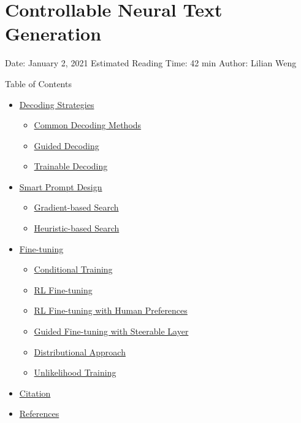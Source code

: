 \section{Controllable Neural Text Generation}\label{controllable-neural-text-generation}

Date: January 2, 2021 \textbar{} Estimated Reading Time: 42 min \textbar{} Author: Lilian Weng

{Table of Contents}

\begin{itemize}
\tightlist
\item
  \hyperref[decoding-strategies]{Decoding Strategies}

  \begin{itemize}
  \tightlist
  \item
    \hyperref[common-decoding-methods]{Common Decoding Methods}
  \item
    \hyperref[guided-decoding]{Guided Decoding}
  \item
    \hyperref[trainable-decoding]{Trainable Decoding}
  \end{itemize}
\item
  \hyperref[smart-prompt-design]{Smart Prompt Design}

  \begin{itemize}
  \tightlist
  \item
    \hyperref[gradient-based-search]{Gradient-based Search}
  \item
    \hyperref[heuristic-based-search]{Heuristic-based Search}
  \end{itemize}
\item
  \hyperref[fine-tuning]{Fine-tuning}

  \begin{itemize}
  \tightlist
  \item
    \hyperref[conditional-training]{Conditional Training}
  \item
    \hyperref[rl-fine-tuning]{RL Fine-tuning}
  \item
    \hyperref[rl-fine-tuning-with-human-preferences]{RL Fine-tuning with Human Preferences}
  \item
    \hyperref[guided-fine-tuning-with-steerable-layer]{Guided Fine-tuning with Steerable Layer}
  \item
    \hyperref[distributional-approach]{Distributional Approach}
  \item
    \hyperref[unlikelihood-training]{Unlikelihood Training}
  \end{itemize}
\item
  \hyperref[citation]{Citation}
\item
  \hyperref[references]{References}
\end{itemize}

